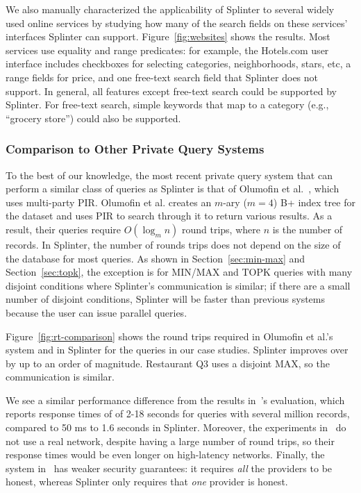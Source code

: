 We also manually characterized the applicability of Splinter to several widely used online services by studying how many of the search fields on these services' interfaces Splinter can support.
Figure~\ref{fig:websites} shows the results. 
Most services use equality and range predicates: for example, the
Hotels.com user interface includes checkboxes for selecting categories, neighborhoods, stars, etc, a range fields for price, and one free-text search field that Splinter does not support.
In general, all features except free-text search could be supported by Splinter.
For free-text search, simple keywords that map to a category (e.g., ``grocery store'') could also be supported.

\subsubsection{Comparison to Other Private Query Systems}
\label{sec:comparison}
To the best of our knowledge, the most recent
private query system that can perform a similar class of queries
as Splinter is that of Olumofin et al.~\cite{goldberg},
which uses multi-party PIR. Olumofin et al. creates
an $m$-ary ($m=4$) B+ index tree for the dataset and
uses PIR to search through
it to return various results. As a result, their queries
require $O(\log_m n)$ round trips, where $n$ is
the number of records. In Splinter, the number of rounds trips
does not depend on the size of the database for most queries.
As shown in Section~\ref{sec:min-max} and Section~\ref{sec:topk}, 
the exception is for MIN/MAX and TOPK queries with many disjoint
conditions where Splinter's
communication is similar; if there are a small number of disjoint
conditions, Splinter will be faster than previous systems 
because the user can issue parallel queries.

Figure~\ref{fig:rt-comparison} shows 
the round trips required in Olumofin et al.'s system and in Splinter
for the queries in our case studies. Splinter improves over~\cite{goldberg}
by up to an order of magnitude. Restaurant Q3
uses a disjoint MAX, so the communication is similar.

We see a similar performance difference from the results
in~\cite{goldberg}'s evaluation, which reports response times of
of 2-18 seconds for queries with several million records, compared to
50 ms to 1.6 seconds in Splinter.
Moreover, the experiments in~\cite{goldberg} do not use a real network,
despite having a large number 
of round trips, so their response times would be even longer
on high-latency networks.
Finally, the system in~\cite{goldberg} has weaker security guarantees:
it requires \textit{all} the providers to be honest, whereas Splinter
only requires that \textit{one} provider is honest.

